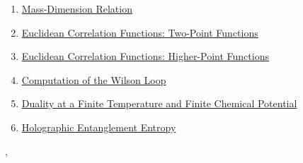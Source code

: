 \documentclass[11pt]{article}
\renewcommand{\today}{\shortmonthname[\the\month] \the \day,  \the\year}
\begin{document}
\begin{enumerate}
	\item  \href{https://mp.weixin.qq.com/s/bMkZhAwN4AFY3uLUTq1tIg}{Mass-Dimension Relation} %
	\item  \href{https://mp.weixin.qq.com/s/KN-wqW2E8PBAijZgTtfgSg}{Euclidean Correlation Functions: Two-Point Functions} %
	\item  \href{https://mp.weixin.qq.com/s/4ncR5_J_qAyDnM5RWU9ajg}{Euclidean Correlation Functions: Higher-Point Functions} %
	\item  \href{https://mp.weixin.qq.com/s/Kv6yo1kx2BuQKeyyatUtuA}{Computation of the Wilson Loop} %
	\item  \href{https://mp.weixin.qq.com/s/qJBR25ok2bz1Q7goEBzABw}{Duality at a Finite Temperature and Finite Chemical Potential} %
	\item  \href{https://mp.weixin.qq.com/s/vcS5nyZudm25g7kQ9nKSCg}{Holographic Entanglement Entropy} %
\end{enumerate}


%
\begin{flushright}
	\tiny \today 
\end{flushright}
\end{document}
